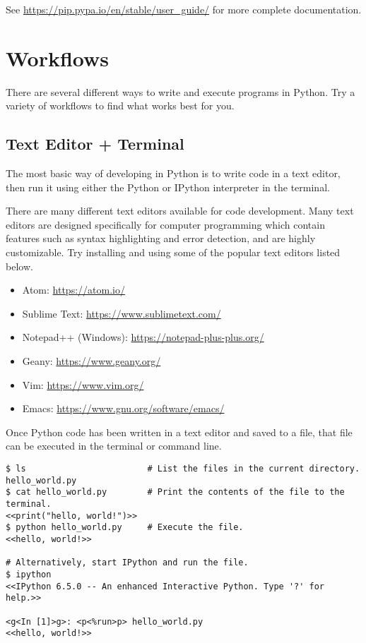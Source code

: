 See \url{https://pip.pypa.io/en/stable/user_guide/} for more complete documentation.

\section*{Workflows} %

There are several different ways to write and execute programs in Python.
Try a variety of workflows to find what works best for you.

\subsection*{Text Editor + Terminal} %

The most basic way of developing in Python is to write code in a text editor, then run it using either the Python or IPython interpreter in the terminal.

There are many different text editors available for code development. Many text editors are designed specifically for computer programming which contain features such as syntax highlighting and error detection, and are highly customizable.
Try installing and using some of the popular text editors listed below.
\begin{itemize}
\item Atom: \url{https://atom.io/}
\item Sublime Text: \url{https://www.sublimetext.com/}
\item Notepad++ (Windows): \url{https://notepad-plus-plus.org/}
\item Geany: \url{https://www.geany.org/}
\item Vim: \url{https://www.vim.org/}
\item Emacs: \url{https://www.gnu.org/software/emacs/}
\end{itemize}

Once Python code has been written in a text editor and saved to a file, that file can be executed in the terminal or command line.
\begin{lstlisting}
$ ls                        # List the files in the current directory.
hello_world.py
$ cat hello_world.py        # Print the contents of the file to the terminal.
<<print("hello, world!")>>
$ python hello_world.py     # Execute the file.
<<hello, world!>>

# Alternatively, start IPython and run the file.
$ ipython
<<IPython 6.5.0 -- An enhanced Interactive Python. Type '?' for help.>>

<g<In [1]>g>: <p<%run>p> hello_world.py
<<hello, world!>>
\end{lstlisting}

